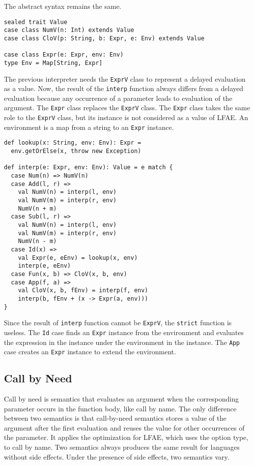 The abstract syntax remains the same.

\begin{verbatim}
sealed trait Value
case class NumV(n: Int) extends Value
case class CloV(p: String, b: Expr, e: Env) extends Value

case class Expr(e: Expr, env: Env)
type Env = Map[String, Expr]
\end{verbatim}

The previous interpreter needs the \verb!ExprV! class to represent a delayed
evaluation as a value. Now, the result of the \verb!interp! function always
differs from a delayed evaluation because any occurrence of a parameter leads to
evaluation of the argument. The \verb!Expr! class replaces the \verb!ExprV!
class. The \verb!Expr! class takes the same role to the \verb!ExprV! class, but
its instance is not considered as a value of LFAE. An environment is a map from a
string to an \verb!Expr! instance.

\begin{verbatim}
def lookup(x: String, env: Env): Expr =
  env.getOrElse(x, throw new Exception)

def interp(e: Expr, env: Env): Value = e match {
  case Num(n) => NumV(n)
  case Add(l, r) =>
    val NumV(n) = interp(l, env)
    val NumV(m) = interp(r, env)
    NumV(n + m)
  case Sub(l, r) =>
    val NumV(n) = interp(l, env)
    val NumV(m) = interp(r, env)
    NumV(n - m)
  case Id(x) =>
    val Expr(e, eEnv) = lookup(x, env)
    interp(e, eEnv)
  case Fun(x, b) => CloV(x, b, env)
  case App(f, a) =>
    val CloV(x, b, fEnv) = interp(f, env)
    interp(b, fEnv + (x -> Expr(a, env)))
}
\end{verbatim}

Since the result of \verb!interp! function cannot be \verb!ExprV!, the
\verb!strict! function is useless. The \verb!Id! case finds an \verb!Expr!
instance from the environment and evaluates the expression in the instance under
the environment in the instance. The \verb!App! case creates an \verb!Expr!
instance to extend the environment.

\subsection{Call by Need
}

Call by need is semantics that evaluates an argument when the corresponding
parameter occurs in the function body, like call by name. The only difference
between two semantics is that call-by-need semantics stores a value of the
argument after the first evaluation and reuses the value for other occurrences of
the parameter. It applies the optimization for LFAE, which uses the option type,
to call by name. Two semantics always produces the same result for languages
without side effects. Under the presence of side effects, two semantics vary.

